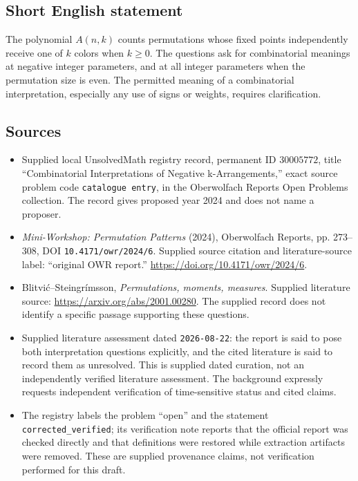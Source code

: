 \documentclass[11pt]{article}
\begin{document}
\subsection{Short English statement}
The polynomial \(A(n,k)\) counts permutations whose fixed points independently receive one of \(k\) colors when \(k\geq0\). The questions ask for combinatorial meanings at negative integer parameters, and at all integer parameters when the permutation size is even. The permitted meaning of a combinatorial interpretation, especially any use of signs or weights, requires clarification.
\subsection{Sources}
\begin{itemize}
\item Supplied local UnsolvedMath registry record, permanent ID \(30005772\), title ``Combinatorial Interpretations of Negative k-Arrangements,'' exact source problem code \texttt{catalogue entry}, in the Oberwolfach Reports Open Problems collection. The record gives proposed year 2024 and does not name a proposer.
\item \emph{Mini-Workshop: Permutation Patterns} (2024), Oberwolfach Reports, pp. 273--308, DOI \texttt{10.4171/owr/2024/6}. Supplied source citation and literature-source label: ``original OWR report.'' \url{https://doi.org/10.4171/owr/2024/6}.
\item Blitvić--Steingrímsson, \emph{Permutations, moments, measures}. Supplied literature source: \url{https://arxiv.org/abs/2001.00280}. The supplied record does not identify a specific passage supporting these questions.
\item Supplied literature assessment dated \texttt{2026-08-22}: the report is said to pose both interpretation questions explicitly, and the cited literature is said to record them as unresolved. This is supplied dated curation, not an independently verified literature assessment. The background expressly requests independent verification of time-sensitive status and cited claims.
\item The registry labels the problem ``open'' and the statement \texttt{corrected\_verified}; its verification note reports that the official report was checked directly and that definitions were restored while extraction artifacts were removed. These are supplied provenance claims, not verification performed for this draft.
\end{itemize}
\end{document}
